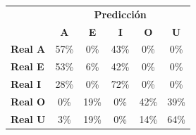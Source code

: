 \begin{tabular}{lccccc}
\toprule
 & \multicolumn{5}{c}{\textbf{Predicción}} \\
 & \textbf{A} & \textbf{E} & \textbf{I} & \textbf{O} & \textbf{U} \\
\midrule
\textbf{Real A} & \cellcolor[rgb]{0.60,0.60,1.00} \color{white} 57\% & \cellcolor[rgb]{1.00,1.00,1.00}  0\% & \cellcolor[rgb]{0.70,0.70,1.00}  43\% & \cellcolor[rgb]{1.00,1.00,1.00}  0\% & \cellcolor[rgb]{1.00,1.00,1.00}  0\% \\
\textbf{Real E} & \cellcolor[rgb]{0.63,0.63,1.00} \color{white} 53\% & \cellcolor[rgb]{0.96,0.96,1.00}  6\% & \cellcolor[rgb]{0.71,0.71,1.00}  42\% & \cellcolor[rgb]{1.00,1.00,1.00}  0\% & \cellcolor[rgb]{1.00,1.00,1.00}  0\% \\
\textbf{Real I} & \cellcolor[rgb]{0.81,0.81,1.00}  28\% & \cellcolor[rgb]{1.00,1.00,1.00}  0\% & \cellcolor[rgb]{0.49,0.49,1.00} \color{white} 72\% & \cellcolor[rgb]{1.00,1.00,1.00}  0\% & \cellcolor[rgb]{1.00,1.00,1.00}  0\% \\
\textbf{Real O} & \cellcolor[rgb]{1.00,1.00,1.00}  0\% & \cellcolor[rgb]{0.86,0.86,1.00}  19\% & \cellcolor[rgb]{1.00,1.00,1.00}  0\% & \cellcolor[rgb]{0.71,0.71,1.00}  42\% & \cellcolor[rgb]{0.73,0.73,1.00}  39\% \\
\textbf{Real U} & \cellcolor[rgb]{0.98,0.98,1.00}  3\% & \cellcolor[rgb]{0.86,0.86,1.00}  19\% & \cellcolor[rgb]{1.00,1.00,1.00}  0\% & \cellcolor[rgb]{0.90,0.90,1.00}  14\% & \cellcolor[rgb]{0.55,0.55,1.00} \color{white} 64\% \\
\bottomrule
\end{tabular}